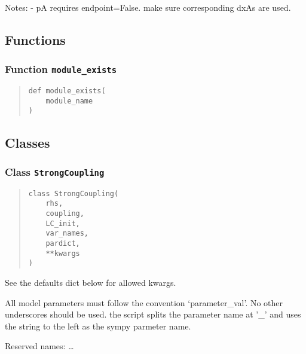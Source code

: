 \documentclass[
  english,
  a4paper,
  oneside]{article}
\begin{document}
Notes: - pA requires endpoint=False. make sure corresponding dxAs are
used.

\hypertarget{functions}{%
\subsection{Functions}\label{functions}}

\hypertarget{StrongCoupling.module_exists}{%
\subsubsection{\texorpdfstring{Function
\texttt{module\_exists}}{Function module\_exists}}\label{StrongCoupling.module_exists}}

\begin{quote}
\begin{verbatim}
def module_exists(
    module_name
)
\end{verbatim}
\end{quote}

\hypertarget{classes}{%
\subsection{Classes}\label{classes}}

\hypertarget{StrongCoupling.StrongCoupling}{%
\subsubsection{\texorpdfstring{Class
\texttt{StrongCoupling}}{Class StrongCoupling}}\label{StrongCoupling.StrongCoupling}}

\begin{quote}
\begin{verbatim}
class StrongCoupling(
    rhs,
    coupling,
    LC_init,
    var_names,
    pardict,
    **kwargs
)
\end{verbatim}
\end{quote}

See the defaults dict below for allowed kwargs.

All model parameters must follow the convention `parameter\_val'. No
other underscores should be used. the script splits the parameter name
at '\_' and uses the string to the left as the sympy parmeter name.

Reserved names: \ldots{}
\end{document}
